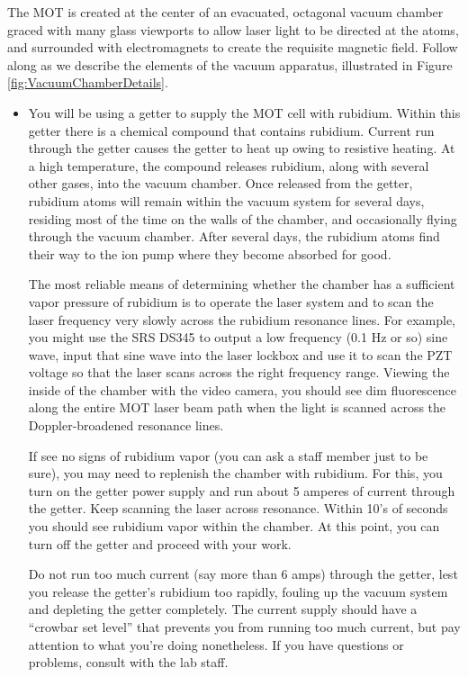 \documentclass{../lab}
\begin{document}
The MOT is created at the center of an evacuated, octagonal vacuum chamber graced with many glass viewports to allow laser light to be directed at the atoms, and surrounded with electromagnets to create the requisite magnetic field. Follow along as we describe the elements of the vacuum apparatus, illustrated in Figure \ref{fig:VacuumChamberDetails}.

\begin{itemize}
    \item You will be using a getter to supply the MOT cell with rubidium.  Within this getter there is a chemical compound that contains rubidium.  Current run through the getter causes the getter to heat up owing to resistive heating.  At a high temperature, the compound releases rubidium, along with several other gases, into the vacuum chamber.  Once released from the getter, rubidium atoms will remain within the vacuum system for several days, residing most of the time on the walls of the chamber, and occasionally flying through the vacuum chamber.  After several days, the rubidium atoms find their way to the ion pump where they become absorbed for good.
    
    The most reliable means of determining whether the chamber has a sufficient vapor pressure of rubidium is to operate the laser system and to scan the laser frequency very slowly across the rubidium resonance lines.  For example, you might use the SRS DS345 to output a low frequency (0.1 Hz or so) sine wave, input that sine wave into the laser lockbox and use it to scan the PZT voltage so that the laser scans across the right frequency range. Viewing the inside of the chamber with the video camera, you should see dim fluorescence along the entire MOT laser beam path when the light is scanned across the Doppler-broadened resonance lines.
    
    If see no signs of rubidium vapor (you can ask a staff member just to be sure), you may need to replenish the chamber with rubidium.  For this, you turn on the getter power supply and run about 5 amperes of current through the getter.  Keep scanning the laser across resonance.  Within 10's of seconds you should see rubidium vapor within the chamber.  At this point, you can turn off the getter and proceed with your work.
    
    Do not run too much current (say more than 6 amps) through the getter, lest you release the getter's rubidium too rapidly, fouling up the vacuum system and depleting the getter completely.  The current supply should have a ``crowbar set level'' that prevents you from running too much current, but pay attention to what you're doing nonetheless.  If you have questions or problems, consult with the lab staff.
    

\end{itemize}
\end{document}
